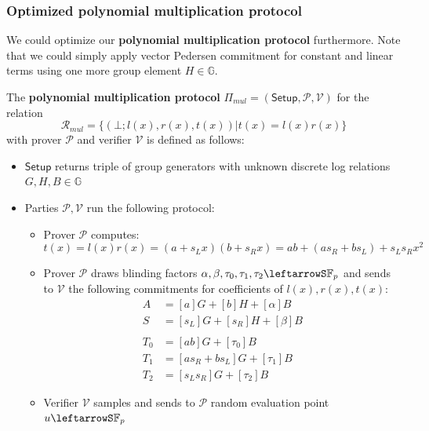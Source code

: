 \documentclass[../lecture-notes-148x210.tex]{subfiles}
\begin{document}
\subsubsection{Optimized polynomial multiplication protocol}
We could optimize our \textbf{polynomial multiplication protocol} furthermore. Note that we could simply apply vector Pedersen commitment for constant and linear terms using one more group element $H \in \mathbb{G}$.

\begin{definition}
    The \textbf{polynomial multiplication protocol} $\Pi_{mul} = (\mathsf{Setup}, \mathcal{P,V})$ for the relation $$\mathcal{R}_{mul} = \{ (\bot;l(x),r(x),t(x)) \vert t(x) = l(x)r(x)\}$$ with prover $\mathcal{P}$ and verifier $\mathcal{V}$ is defined as follows:
    \begin{itemize}
        \item $\mathsf{Setup}$ returns triple of group generators with unknown discrete log relations $G, H, B \in \mathbb{G}$
        \item Parties $\mathcal{P, V}$ run the following protocol:
            \begin{itemize}
                \item Prover $\mathcal{P}$ computes:
                    $$t(x) = l(x)r(x) = (a+s_L x)(b+s_R x) = ab + (as_R + bs_L) + s_L s_R x^2$$
                \item Prover $\mathcal{P}$ draws blinding factors $\alpha, \beta, \tau_0, \tau_1, \tau_2 \leftarrowS \mathbb{F}_p$ and sends to $\mathcal{V}$ the following commitments for coefficients of $l(x), r(x), t(x)$:
                    \begin{equation}
                        \begin{aligned}
                            A &= [a]G + [b]H + [\alpha]B\\
                            S &= [s_L]G + [s_R]H + [\beta]B\\
                            &\\ %
                            T_0 &= [ab]G + [\tau_0]B \\
                            T_1 &= [as_R + bs_L]G + [\tau_1]B \\
                            T_2 &= [s_L s_R]G + [\tau_2]B
                        \end{aligned}
                    \end{equation}
                \item Verifier $\mathcal{V}$ samples and sends to $\mathcal{P}$ random evaluation point $u \leftarrowS \mathbb{F}_p$

\end{itemize}
\end{itemize}
\end{definition}
\end{document}

